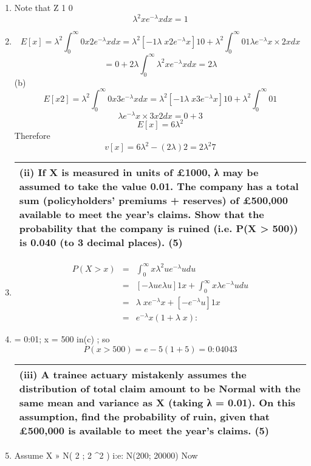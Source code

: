 \documentclass[a4paper,12pt]{article}
\begin{document}
\begin{enumerate}
\item  Note that Z 1
0
\[\lambda^2 xe^{-\lambda}xdx = 1\]
\item 
\[E[x] = \lambda^2  \int^{\infty}_{0}
0 x2e^{-\lambda}xdx = \lambda^2 [-1
\lambda \;x2e^{-\lambda}x]1
0 + \lambda^2  \int^{\infty}_{0}
0
1
\lambda e^{-\lambda}x \times 2xdx\]
\[= 0 + 2
\lambda
\int^{\infty}_{0}
 \lambda^2 xe^{-\lambda}xdx = 2
\lambda\]
(b)
\[E[x2] = \lambda^2  \int^{\infty}_{0}
0 x3e^{-\lambda}xdx = \lambda^2 [-1
\lambda \;x3e^{-\lambda}x]1
0 + \lambda^2  \int^{\infty}_{0}
0
1\]
\[\lambda e^{-\lambda}x \times 3x2dx
= 0 + 3\]
\[E[x] = 6
\lambda^2 \]
Therefore
\[v[x] =
6
\lambda^2 
- (
2
\lambda
)2 =
2
\lambda^2 
7\]
\newpage


  \begin{table}[ht!]
     \centering
     \begin{tabular}{|p{15cm}|}
     \hline  
(ii) If X is measured in units of £1000, λ may be assumed to take the value 0.01.  The company has a total sum (policyholders’ premiums + reserves) of £500,000 available to meet the year’s claims.  Show that the probability that the company is ruined (i.e. P(X > 500)) is 0.040 (to 3 decimal places). (5) 
 \\ \hline
      \end{tabular}
    \end{table}
        
\item 
\begin{eqnarray*}
P(X > x) &=&
\int^{\infty}_{0}
x \lambda^2 ue^{-\lambda}udu \\ &=& [-\lambda u e\lambda u]1x
+
\int^{\infty}_{0}
x \lambda e^{-\lambda}udu
\\ &=& \lambda \;xe^{-\lambda}x + [-e^{-\lambda}u]1x
\\ &=& e^{-\lambda}x(1 + \lambda \;x):
\end{eqnarray*}
\item  \lambda = 0:01; x = 500 in(c) ; so \[P(x > 500) = e-5(1 + 5) = 0:04043\]

\newpage



  \begin{table}[ht!]
     \centering
     \begin{tabular}{|p{15cm}|}
     \hline  
(iii) A trainee actuary mistakenly assumes the distribution of total claim amount to be Normal with the same mean and variance as X (taking λ = 0.01).  On this assumption, find the probability of ruin, given that £500,000 is available to meet the year’s claims. (5) 
\\ \hline
      \end{tabular}
    \end{table}
\item Assume X » N( 2
\lambda; 2
\lambda^2  ) i:e: N(200; 20000)
Now


\end{enumerate}
\end{document}
